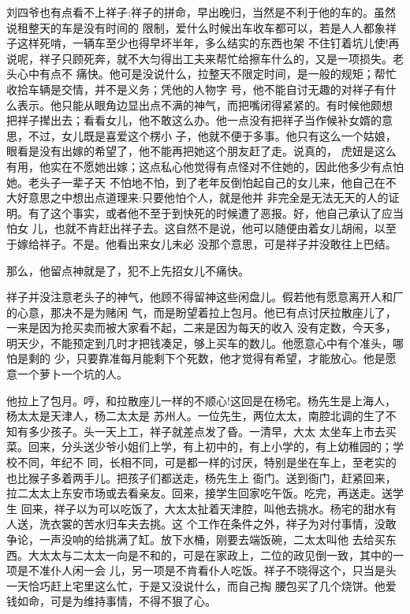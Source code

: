 \documentclass[11pt,a4paper,onecolumn]{article}
\begin{document}
刘四爷也有点看不上祥子:祥子的拼命，早出晚归，当然是不利于他的车的。虽然说租整天的车是没有时间的
限制，爱什么时候出车收车都可以，若是人人都象祥子这样死啃，一辆车至少也得早坏半年，多么结实的东西也架
不住钉着坑儿使!再说呢，祥子只顾死奔，就不大匀得出工夫来帮忙给擦车什么的，又是一项损失。老头心中有点不
痛快。他可是没说什么，拉整天不限定时间，是一般的规矩；帮忙收拾车辆是交情，并不是义务；凭他的人物字
号，他不能自讨无趣的对祥子有什么表示。他只能从眼角边显出点不满的神气，而把嘴闭得紧紧的。有时候他颇想
把祥子撵出去；看看女儿，他不敢这么办。他一点没有把祥子当作候补女婿的意思，不过，女儿既是喜爱这个楞小
子，他就不便于多事。他只有这么一个姑娘，眼看是没有出嫁的希望了，他不能再把她这个朋友赶了走。说真的，
虎妞是这么有用，他实在不愿她出嫁；这点私心他觉得有点怪对不住她的，因此他多少有点怕她。老头子一辈子天
不怕地不怕，到了老年反倒怕起自己的女儿来，他自己在不大好意思之中想出点道理来:只要他怕个人，就是他并
非完全是无法无天的人的证明。有了这个事实，或者他不至于到快死的时候遭了恶报。好，他自己承认了应当怕女
儿，也就不肯赶出祥子去。这自然不是说，他可以随便由着女儿胡闹，以至于嫁给祥子。不是。他看出来女儿未必
没那个意思，可是祥子并没敢往上巴结。

那么，他留点神就是了，犯不上先招女儿不痛快。

祥子并没注意老头子的神气，他顾不得留神这些闲盘儿。假若他有愿意离开人和厂的心意，那决不是为赌闲
气，而是盼望着拉上包月。他已有点讨厌拉散座儿了，一来是因为抢买卖而被大家看不起，二来是因为每天的收入
没有定数，今天多，明天少，不能预定到几时才把钱凑足，够上买车的数儿。他愿意心中有个准头，哪怕是剩的
少，只要靠准每月能剩下个死数，他才觉得有希望，才能放心。他是愿意一个萝卜一个坑的人。

他拉上了包月。哼，和拉散座儿一样的不顺心!这回是在杨宅。杨先生是上海人，杨太太是天津人，杨二太太是
苏州人。一位先生，两位太太，南腔北调的生了不知有多少孩子。头一天上工，祥子就差点发了昏。一清早，大太
太坐车上市去买菜。回来，分头送少爷小姐们上学，有上初中的，有上小学的，有上幼稚园的；学校不同，年纪不
同，长相不同，可是都一样的讨厌，特别是坐在车上，至老实的也比猴子多着两手儿。把孩子们都送走，杨先生上
衙门。送到衙门，赶紧回来，拉二太太上东安市场或去看亲友。回来，接学生回家吃午饭。吃完，再送走。送学生
回来，祥子以为可以吃饭了，大太太扯着天津腔，叫他去挑水。杨宅的甜水有人送，洗衣裳的苦水归车夫去挑。这
个工作在条件之外，祥子为对付事情，没敢争论，一声没响的给挑满了缸。放下水桶，刚要去端饭碗，二太太叫他
去给买东西。大太太与二太太一向是不和的，可是在家政上，二位的政见倒一致，其中的一项是不准仆人闲一会
儿，另一项是不肯看仆人吃饭。祥子不晓得这个，只当是头一天恰巧赶上宅里这么忙，于是又没说什么，而自己掏
腰包买了几个烧饼。他爱钱如命，可是为维持事情，不得不狠了心。
\end{document}
